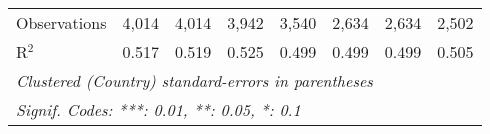 \begin{table}[htbp]
\begin{tabular}{lccccccc}
      Observations                                                     & 4,014         & 4,014        & 3,942         & 3,540       & 2,634   & 2,634   & 2,502\\  
      R$^2$                                                            & 0.517         & 0.519        & 0.525         & 0.499       & 0.499   & 0.499   & 0.505\\  
      \midrule
      \multicolumn{8}{l}{\emph{Clustered (Country) standard-errors in parentheses}}\\
      \multicolumn{8}{l}{\emph{Signif. Codes: ***: 0.01, **: 0.05, *: 0.1}}\\
   \end{tabular}
\end{table}


